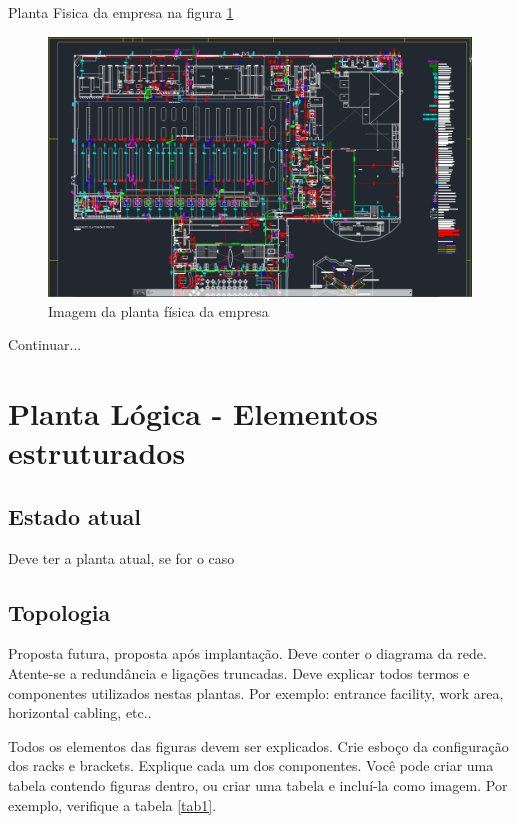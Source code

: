 \documentclass[	DIV=calc,%
							paper=a4,%
							fontsize=12pt,%
							onecolumn]{scrartcl}	 					%
\begin{document}
Planta Fisica da empresa na figura \ref{Fig_estrutura_predial}

\begin{figure}
	\centering
	\includegraphics[width=\textwidth]{Fig_estrutura_predial}
	\caption{Imagem da planta física da empresa}
	\label{Fig_estrutura_predial}
\end{figure}

Continuar...

\section{Planta Lógica - Elementos estruturados}

\subsection{Estado atual}
Deve ter a planta atual, se for o caso

\subsection{Topologia}
Proposta futura, proposta após implantação.
Deve conter o diagrama da rede. Atente-se a redundância  e ligações truncadas.
Deve explicar todos termos e componentes utilizados nestas plantas. Por exemplo: entrance facility, work area, horizontal cabling, etc..

Todos os elementos das figuras devem ser explicados. 
Crie esboço da configuração dos racks e brackets. Explique cada um dos componentes. Você pode criar uma tabela contendo figuras dentro, ou criar uma tabela e incluí-la como imagem. Por exemplo, verifique a tabela \ref{tab1}.


\end{document}
